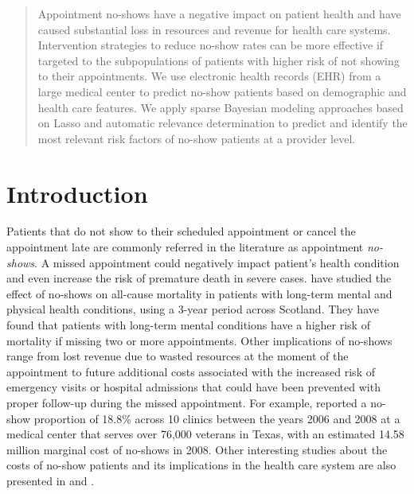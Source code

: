 \documentclass[twoside,11pt]{article}
\begin{document}
 
\maketitle

\begin{abstract}
Appointment no-shows have a negative impact on patient health and have caused
substantial loss in resources and revenue for health care systems. Intervention strategies to reduce no-show rates can be more effective if targeted to the subpopulations of patients with higher risk of not showing to their appointments. We use electronic health records (EHR) from a large medical center to predict no-show patients based on demographic and health care features. We apply sparse Bayesian modeling approaches based on Lasso and automatic relevance determination to predict and identify the most relevant risk factors of no-show patients at a provider level. 
\end{abstract}

\section{Introduction}

Patients that do not show to their scheduled appointment or cancel the appointment late are commonly referred in the literature as appointment \emph{no-shows}. {\color{red} A missed appointment could negatively impact patient's health condition and even increase the risk of premature death in severe cases. \cite{McQueenie19} have studied the effect of no-shows on all-cause mortality in patients with long-term mental and physical health conditions, using a 3-year period across Scotland. They have found that patients with long-term mental conditions have a higher risk of mortality if missing two or more appointments.} Other implications of no-shows range from lost revenue due to wasted resources at the moment of the appointment to future additional costs associated with the increased risk of emergency visits or hospital admissions that could have been prevented with proper follow-up during the missed appointment. For example, \cite{Kheirkhah16} reported a no-show proportion of 18.8\% across 10 clinics between the years 2006 and 2008 at a medical center that serves over 76,000 veterans in Texas, with an estimated 14.58 million marginal cost of no-shows in 2008. Other interesting studies about the costs of no-show patients and its implications in the health care system are also presented in \cite{Nuti12} and \cite{Hwang15}.
\end{document}
